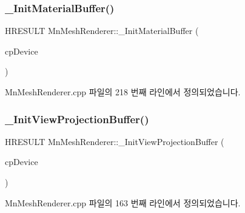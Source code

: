 \subsubsection{\texorpdfstring{\+\_\+\+Init\+Material\+Buffer()}{\_InitMaterialBuffer()}}
{\footnotesize\ttfamily H\+R\+E\+S\+U\+LT Mn\+Mesh\+Renderer\+::\+\_\+\+Init\+Material\+Buffer (\begin{DoxyParamCaption}\item[{const \hyperlink{namespace_m_n_l_a1eec210db8f309a4a9ac0d9658784c31}{C\+P\+D3\+D\+Device} \&}]{cp\+Device }\end{DoxyParamCaption})\hspace{0.3cm}{\ttfamily [private]}}



Mn\+Mesh\+Renderer.\+cpp 파일의 218 번째 라인에서 정의되었습니다.

\mbox{\label{class_m_n_l_1_1_mn_mesh_renderer_aa48062a8d90af6b41fc06c6cd4a8dadd}} 
\subsubsection{\texorpdfstring{\+\_\+\+Init\+View\+Projection\+Buffer()}{\_InitViewProjectionBuffer()}}
{\footnotesize\ttfamily H\+R\+E\+S\+U\+LT Mn\+Mesh\+Renderer\+::\+\_\+\+Init\+View\+Projection\+Buffer (\begin{DoxyParamCaption}\item[{const \hyperlink{namespace_m_n_l_a1eec210db8f309a4a9ac0d9658784c31}{C\+P\+D3\+D\+Device} \&}]{cp\+Device }\end{DoxyParamCaption})\hspace{0.3cm}{\ttfamily [private]}}



Mn\+Mesh\+Renderer.\+cpp 파일의 163 번째 라인에서 정의되었습니다.

\mbox{\label{class_m_n_l_1_1_mn_mesh_renderer_aba7a3676a4b264a813b64f05e06ac11c}} 

